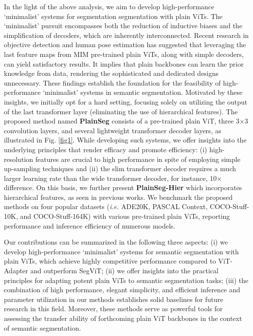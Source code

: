 \documentclass{article} \usepackage{iclr2024_conference,times}
\begin{document}
In the light of the above analysis, we aim to develop high-performance `minimalist' systems for segmentation segmentation with plain ViTs. The `minimalist' pursuit encompasses both the reduction of inductive biases and the simplification of decoders, which are inherently interconnected. Recent research in objective detection \citep{li2022exploring} and human pose estimation \citep{xu2022vitpose} has suggested that leveraging the last feature maps from MIM pre-trained plain ViTs, along with simple decoders, can yield satisfactory results. It implies that plain backbones can learn the prior knowledge from data, rendering the sophisticated and dedicated designs unnecessary. These findings establish the foundation for the feasibility of high-performance `minimalist' systems in semantic segmentation. Motivated by these insights, we initially opt for a hard setting, focusing solely on utilizing the output of the last transformer layer (eliminating the use of hierarchical features). The proposed method named \textbf{PlainSeg} consists of a pre-trained plain ViT, three 3$\times$3 convolution layers, and several lightweight transformer decoder layers, as illustrated in Fig. \ref{fig1}. While developing such systems, we offer insights into the underlying principles that render efficacy and promote efficiency: (i) high-resolution features are crucial to high performance in spite of employing simple up-sampling techniques and (ii) the slim transformer decoder requires a much larger learning rate than the wide transformer decoder, for instance, 10$\times$ difference. On this basis, we further present \textbf{PlainSeg-Hier} which incorporates hierarchical features, as seen in previous works. We benchmark the proposed methods on four popular datasets (\textit{i.e.} ADE20K, PASCAL Context, COCO-Stuff-10K, and COCO-Stuff-164K) with various pre-trained plain ViTs, reporting performance and inference efficiency of numerous models.

Our contributions can be summarized in the following three aspects: (i) we develop high-performance `minimalist' systems for semantic segmentation with plain ViTs, which achieve highly competitive performance compared to ViT-Adapter and outperform SegViT; (ii) we offer insights into the practical principles for adapting potent plain ViTs to semantic segmentation tasks; (iii) the combination of high performance, elegant simplicity, and efficient inference and parameter utilization in our methods establishes solid baselines for future research in this field. Moreover, these methods serve as powerful tools for assessing the transfer ability of forthcoming plain ViT backbones in the context of semantic segmentation.
\end{document}
